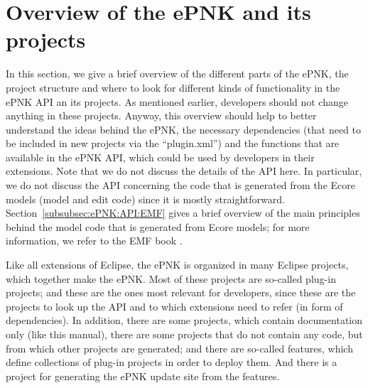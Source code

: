 \section{Overview of the ePNK and its projects}
\label{sec:overviewAPI}

In this section, we give a brief overview of the different parts of the ePNK,
the project structure and where to look for different kinds of functionality in
the ePNK API an its projects. As mentioned earlier, developers should not change
anything in these projects. Anyway, this overview should help to better understand the ideas
behind the ePNK, the necessary dependencies (that need to be included in
new projects via the  ``plugin.xml'') and the functions that are available in
the ePNK API, which could be used by developers in their extensions. Note that
we do not discuss the details of the API here. In particular, we do
not discuss the API concerning the code that is generated from the Ecore
models (model and edit code) since it is mostly straightforward.
Section~\ref{subsubsec:ePNK:API:EMF} gives a brief overview of the main
principles behind the model code that is generated from Ecore models; for
more information, we refer to the EMF book \cite{BSM06}.

Like all extensions of Eclipse, the ePNK is organized in many Eclipse projects,
which together make the ePNK. Most of these projects are so-called plug-in
projects; and these are the ones most relevant for developers, since
these are the projects to look up the API and to which extensions need to
refer (in form of dependencies). In addition, there are some projects, which
contain documentation only (like this manual), there are some projects that
do not contain any code, but from which other projects are generated; and
there are so-called features, which define collections of plug-in projects in
order to deploy them. And there is a project for generating the ePNK update site
from the features.

